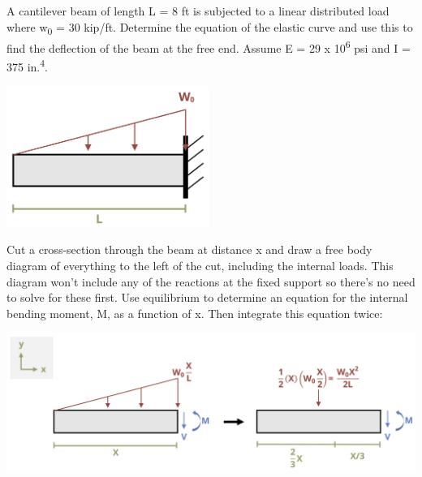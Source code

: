 \documentclass[
  letterpaper,
  DIV=11,
  numbers=noendperiod]{scrreprt}
\begin{document}
\begin{tcolorbox}[enhanced jigsaw, colbacktitle=quarto-callout-note-color!10!white, title={Example 11.2}, coltitle=black, leftrule=.75mm, rightrule=.15mm, opacityback=0, breakable, colframe=quarto-callout-note-color-frame, left=2mm, arc=.35mm, colback=white, bottomrule=.15mm, bottomtitle=1mm, toptitle=1mm, titlerule=0mm, opacitybacktitle=0.6, toprule=.15mm]

A cantilever beam of length L = 8 ft is subjected to a linear
distributed load where w\textsubscript{0} = 30 kip/ft. Determine the
equation of the elastic curve and use this to find the deflection of the
beam at the free end. Assume E = 29 x 10\textsuperscript{6} psi and I =
375 in.\textsuperscript{4}.

\begin{center}
\includegraphics[width=2.59375in,height=\textheight]{images/CH11 PNGs/example11.2-1.png}
\end{center}

\begin{tcolorbox}[enhanced jigsaw, colbacktitle=quarto-callout-note-color!10!white, title={Solution}, coltitle=black, leftrule=.75mm, rightrule=.15mm, opacityback=0, breakable, colframe=quarto-callout-note-color-frame, left=2mm, arc=.35mm, colback=white, bottomrule=.15mm, bottomtitle=1mm, toptitle=1mm, titlerule=0mm, opacitybacktitle=0.6, toprule=.15mm]

Cut a cross-section through the beam at distance x and draw a free body
diagram of everything to the left of the cut, including the internal
loads. This diagram won't include any of the reactions at the fixed
support so there's no need to solve for these first. Use equilibrium to
determine an equation for the internal bending moment, M, as a function
of x. Then integrate this equation twice:

\begin{center}
\includegraphics{images/CH11 PNGs/example11.2-2.png}
\end{center}


\end{tcolorbox}
\end{tcolorbox}
\end{document}
